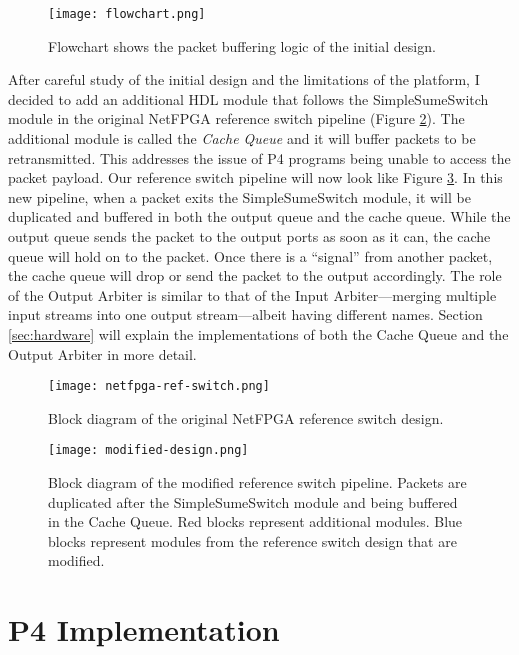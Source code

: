 \begin{figure}[ht]
	\centering
	\texttt{[image: flowchart.png]}
	\caption{Flowchart shows the packet buffering logic of the initial design.}
	\label{fig:flowchart}
\end{figure}

After careful study of the initial design and the limitations of the platform, I decided to add an additional HDL module that follows the SimpleSumeSwitch module in the original NetFPGA reference switch pipeline (Figure \ref{fig:netfpga-ref-switch}). The additional module is called the \textit{Cache Queue} and it will buffer packets to be retransmitted. This addresses the issue of P4 programs being unable to access the packet payload. Our reference switch pipeline will now look like Figure \ref{fig:modified-design}. In this new pipeline, when a packet exits the SimpleSumeSwitch module, it will be duplicated and buffered in both the output queue and the cache queue. While the output queue sends the packet to the output ports as soon as it can, the cache queue will hold on to the packet. Once there is a ``signal'' from another packet, the cache queue will drop or send the packet to the output accordingly. The role of the Output Arbiter is similar to that of the Input Arbiter---merging multiple input streams into one output stream---albeit having different names. Section \ref{sec:hardware} will explain the implementations of both the Cache Queue and the Output Arbiter in more detail.

\begin{figure}[!h]
	\centering
	\texttt{[image: netfpga-ref-switch.png]}
	\caption{Block diagram of the original NetFPGA reference switch design.}
	\label{fig:netfpga-ref-switch}
\end{figure}

\begin{figure}[!h]
	\centering
	\texttt{[image: modified-design.png]}
	\caption{Block diagram of the modified reference switch pipeline. Packets are duplicated after the SimpleSumeSwitch module and being buffered in the Cache Queue. Red blocks represent additional modules. Blue blocks represent modules from the reference switch design that are modified.}
	\label{fig:modified-design}
\end{figure}

\section{P4 Implementation}
